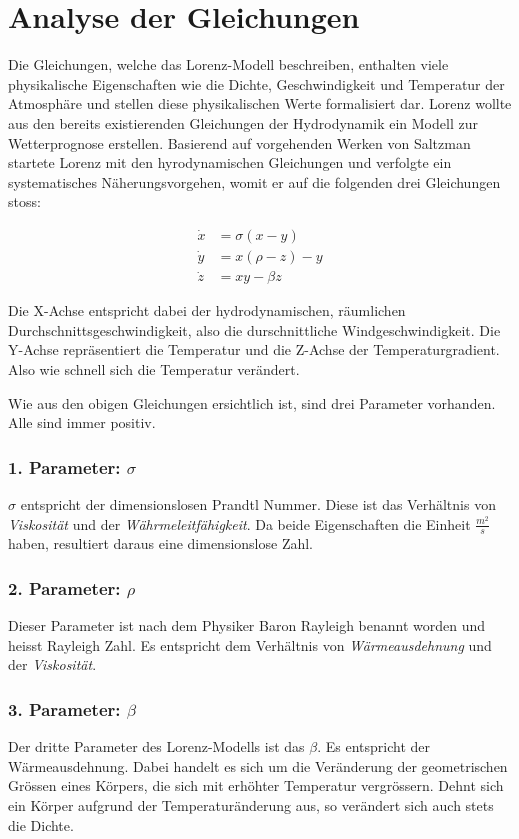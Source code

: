 
\section{Analyse der Gleichungen}
Die Gleichungen, welche das Lorenz-Modell beschreiben, enthalten viele physikalische Eigenschaften wie die Dichte, Geschwindigkeit und Temperatur der Atmosphäre und stellen diese physikalischen Werte formalisiert dar. Lorenz wollte aus den bereits existierenden Gleichungen der Hydrodynamik ein Modell zur Wetterprognose erstellen. Basierend auf vorgehenden Werken von Saltzman startete Lorenz mit den hyrodynamischen Gleichungen und verfolgte ein systematisches Näherungsvorgehen, womit er auf die folgenden drei Gleichungen stoss:

\begin{align}
\dot{x} &= \sigma(x - y)\\
\dot{y} &= x(\rho - z) - y\\
\dot{z} &= xy - \beta z
\end{align}

Die X-Achse entspricht dabei der hydrodynamischen, räumlichen Durchschnittsgeschwindigkeit, also die durschnittliche Windgeschwindigkeit. Die Y-Achse repräsentiert die Temperatur und die Z-Achse der Temperaturgradient. Also wie schnell sich die Temperatur verändert. 

Wie aus den obigen Gleichungen ersichtlich ist, sind drei Parameter vorhanden. Alle sind immer positiv.

\subsubsection{1. Parameter: $\sigma$}
$\sigma$ entspricht der dimensionslosen Prandtl Nummer. Diese ist das Verhältnis von \textit{Viskosität} und der \textit{Währmeleitfähigkeit}. Da beide Eigenschaften die Einheit $\frac{m^2}{s}$ haben, resultiert daraus eine dimensionslose Zahl.

\subsubsection{2. Parameter: $\rho$}
Dieser Parameter ist nach dem Physiker Baron Rayleigh benannt worden und heisst Rayleigh Zahl. Es entspricht dem Verhältnis von \textit{Wärmeausdehnung} und der \textit{Viskosität}.

\subsubsection{3. Parameter: $\beta$}
Der dritte Parameter des Lorenz-Modells ist das $\beta$. Es entspricht der Wärmeausdehnung. Dabei handelt es sich um die Veränderung der geometrischen Grössen eines Körpers, die sich mit erhöhter Temperatur vergrössern. Dehnt sich ein Körper aufgrund der Temperaturänderung aus, so verändert sich auch stets die Dichte.

